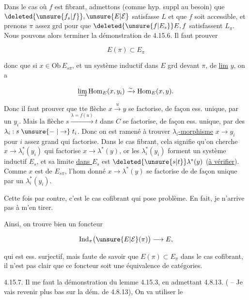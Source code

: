 

Dans le cas où $f$ est fibrant, admettons (comme hyp. suppl au besoin) que $\deleted{\unsure{f_s|f}},\unsure{E|\mathcal E}$ satisfasse $L$ et que $f$ soit accessible, et prenons $\pi$ assez grd pour que $\deleted{\unsure{f|E_s}}E,f$ satisfassent $L_\pi$. Nous pouvons alors terminer la démonstration de 4.15.6. Il faut prouver

\[ E(\pi)\subset E_\pi \]

donc que si $x\in\mathrm{Ob}\,E_{s\pi}$, et  un système inductif dans $E$ grd devant $\pi$, de \uline{lim} $y$, on a

\[ \varinjlim\mathrm{Hom}_{E}(x,y_i)\xrightarrow{\sim}\mathrm{Hom}_{E}(x,y). \]

Donc il faut prouver que tte flèche $x\xrightarrow{u}y$ se factorise, de façon ess. unique, par un $y_i$. Mais la flèche $s\xrightarrow{\lambda=f(u)}t$ dans $C$ se factorise, de façon ess. unique, par des $\lambda_i:s\mathrel{\unsure{\relbar|\to}}t_i$. Donc on est ramené à trouver  \uline{$\lambda_i$-morphisme} $x\longrightarrow y_i$ pour $i$ assez grand qui factorise. Dans le cas fibrant, cela signifie qu'on cherche $x\longrightarrow\lambda_i^*(y_i)$ qui factorise $x\longrightarrow\lambda^*(y)$, or les $\lambda_i^*(y_i)$ forment un système inductif  $E_s$, et sa limite \uline{dans $E_s$} est $\deleted{\unsure{s|t}}\lambda^*(y)$ (\uline{à vérifier}). Comme $x$ est de $E_{s\pi}$, l'hom donné $x\longrightarrow\lambda^*(y)$ se factorise de
%
%
de façon  unique par un $\lambda_i^*(y_i)$.

Cette fois par contre, c'est le cas cofibrant qui pose problème. En fait, je n'arrive pas à m'en tirer.

Ainsi, on trouve bien un foncteur

\[ \mathrm{Ind}_\pi\bigl(\unsure{E|\mathcal E}(\pi)\bigr)\longrightarrow E, \]

qui est ess. surjectif, mais faute de savoir que $E(\pi)\subset E_\pi$ dans le cas cofibrant, il n'est pas clair que ce foncteur soit une équivalence de catégories.

4.15.7. Il me faut  la démonstration du lemme 4.15.3, en admettant 4.8.13. ( -- Je vais revenir plus bas sur la dém. de 4.8.13), On va utiliser le

